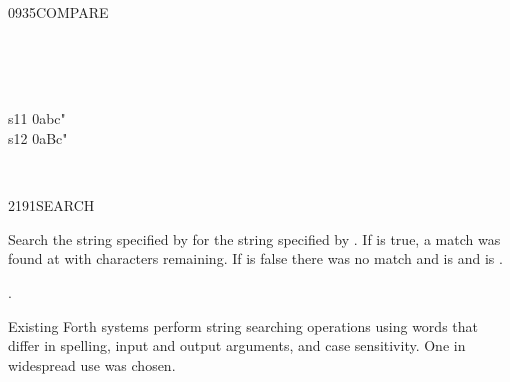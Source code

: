 \begin{worddef}{0935}{COMPARE}
\begin{testing}
		 \\
		 \\
		 \\

		\word{:} s11  0abc" \word{;} \\
		\word{:} s12  0aBc" \word{;}

		 \\
	\end{testing}
\end{worddef}


\begin{worddef}{2191}{SEARCH}
\item {}

	Search the string specified by  for the
	string specified by . If  is
	true, a match was found at  with 
	characters remaining. If  is false there was no
	match and  is  and 
	is .

\see {}.

	\begin{rationale} %
		Existing Forth systems perform string searching operations
		using words that differ in spelling, input and output
		arguments, and case sensitivity. One in widespread use was
		chosen.
	\end{rationale}

	\begin{testing}
		 \\
		 \\
		 \\
		 \\
		 \\

		 \\
		 \\
		 \\
		 \\
		 \\
	\end{testing}
\end{worddef}


